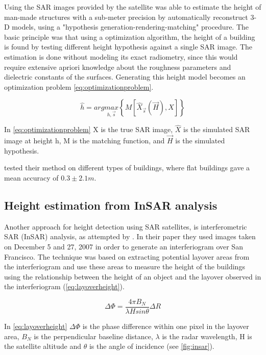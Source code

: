 Using the SAR images provided by the satellite \cite{Brunner2008} was able to estimate the height of man-made structures with a sub-meter precision by automatically reconstruct 3-D models, using a "hypothesis generation-rendering-matching" procedure. The basic principle was that using a optimization algorithm, the height of a building is found by testing different height hypothesis against a single SAR image. The estimation is done without modeling its exact radiometry, since this would require extensive apriori knowledge about the roughness parameters and dielectric constants of the surfaces. Generating this height model becomes an optimization problem \autoref{eq:optimizationproblem}.

\begin{equation}
	\hat{h} = arg \underset{h,\overrightarrow{s}}{max}\left\{M\left[\hat{X}_{\overrightarrow{s}}(\overrightarrow{H}),X\right]\right\}
	\label{eq:optimizationproblem}
\end{equation}

In \autoref{eq:optimizationproblem} X is the true SAR image, $\hat{X}$ is the simulated SAR image at height h, M is the matching function, and $\overrightarrow{H}$ is the simulated hypothesis.

\cite{Brunner2008} tested their method on different types of buildings, where flat buildings gave a mean accuracy of $0.3 \pm 2.1 m$. 

\subsection{Height estimation from InSAR analysis}
Another approach for height detection using SAR satellites, is interferometric SAR (InSAR) analysis, as attempted by \cite{Liu2015}. In their paper they used images taken on December 5 and 27, 2007 in order to generate an interferiogram over San Francisco. The technique was based on extracting potential layover areas from the interferiogram and use these areas to measure the height of the buildings using the relationship between the height of an object and the layover observed in the interferiogram (\autoref{eq:layoverheight}).

\begin{equation}
	\Delta\Phi=\frac{4 \pi B_{N}}{\lambda H sin{\theta}}\Delta R
	\label{eq:layoverheight}
\end{equation}

In \autoref{eq:layoverheight} $\Delta\Phi$ is the phase difference within one pixel in the layover area, $B_{N}$ is the perpendicular baseline distance, $\lambda$ is the radar wavelength, H is the satellite altitude and $\theta$ is the angle of incidence (see \autoref{fig:insar}).

